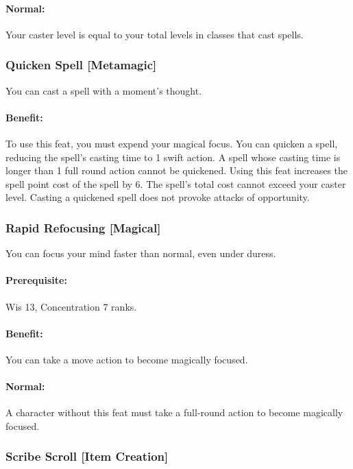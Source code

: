 \paragraph{Normal:} Your caster level is equal to your total levels in classes that cast spells.

\subsubsection[Quicken Spell]{Quicken Spell [Metamagic]}
\label{Feat:QuickenSpell}
You can cast a spell with a moment's thought.

\paragraph{Benefit:} To use this feat, you must expend your magical focus. 
You can quicken a spell, reducing the spell's casting time to 1 swift action. 
A spell whose casting time is longer than 1 full round action cannot be quickened.
Using this feat increases the spell point cost of the spell by 6. The spell's total cost cannot exceed your caster level.
Casting a quickened spell does not provoke attacks of opportunity.
\subsubsection[Rapid Refocusing]{Rapid Refocusing [Magical]}
\label{Feat:RapidRefocusing}
You can focus your mind faster than normal, even under duress.

\paragraph{Prerequisite:} Wis 13, Concentration 7 ranks.

\paragraph{Benefit:} You can take a move action to become magically focused.

\paragraph{Normal:} A character without this feat must take a full-round action to become magically focused.

\subsubsection[Scribe Scroll]{Scribe Scroll [Item Creation]}
\label{Feat:ScribeScroll}

